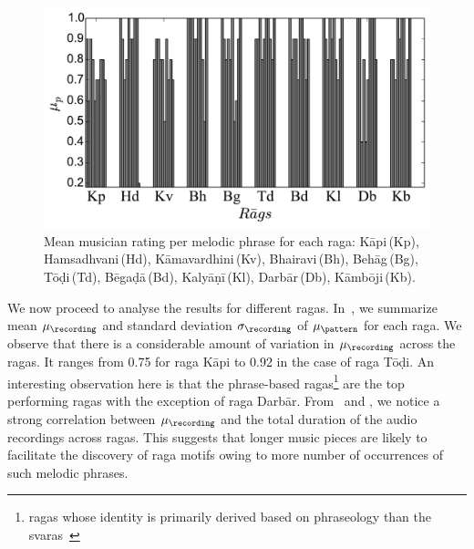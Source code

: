 {\begin{figure}
	\begin{center}
		\includegraphics[width=\figSizeEighty]{ch06_patterns/figures/Characterization/per_raaga_per_phrase_rating.pdf}
	\end{center}
	\caption[Mean musician ratings for the discovered melodic phrases]{Mean musician rating per melodic phrase for each \gls{raga}: K\={a}pi\,(Kp), Hamsadhvani\,(Hd), K\={a}mavardhini\,(Kv), Bhairavi\,(Bh), Beh\={a}g\,(Bg), T\={o}\d{d}i\,(Td), B\={e}ga\d{d}\={a}\,(Bd), Kaly\={a}\d{n}\={i}\,(Kl), Darb\={a}r\,(Db), K\={a}mb\={o}ji\,(Kb).}
	\label{fig:average_rating_pattern_characterization}
\end{figure}


We now proceed to analyse the results for different \glspl{raga}. In~, we summarize mean $\mu_\recording$ and standard deviation $\sigma_\recording$ of $\mu_\pattern$ for each \gls{raga}. We observe that there is a considerable amount of variation in $\mu_\recording$ across the \glspl{raga}. It ranges from 0.75 for \gls{raga} K\={a}pi to 0.92 in the case of \gls{raga} T\={o}\d{d}i. An interesting observation here is that the phrase-based \glspl{raga}\footnote{\Glspl{raga} whose identity is primarily derived based on phraseology than the \glspl{svara}~\citep{krishna2012carnatic}} are the top performing \glspl{raga} with the exception of \gls{raga} Darb\={a}r. From~ and , we notice a strong correlation between $\mu_\recording$ and the total duration of the audio recordings across \glspl{raga}. This suggests that longer music pieces are likely to facilitate the discovery of \gls{raga} motifs owing to more number of occurrences of such melodic phrases.

}
